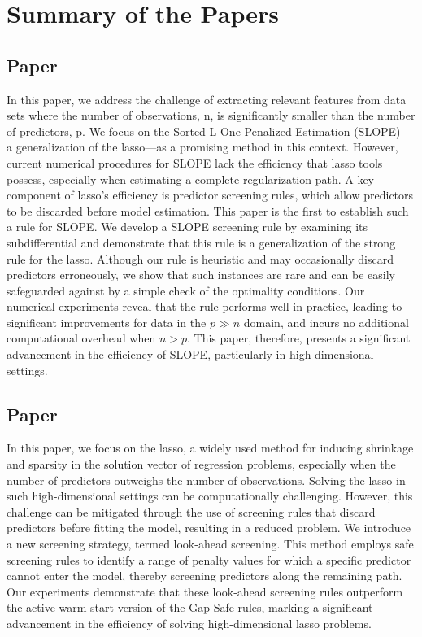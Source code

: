 \section{Summary of the Papers}

\subsection{Paper \I}

In this paper, we address the challenge of extracting relevant features from data sets where the number of observations, n, is significantly smaller than the number of predictors, p. We focus on the Sorted L-One Penalized Estimation (SLOPE)—a generalization of the lasso—as a promising method in this context. However, current numerical procedures for SLOPE lack the efficiency that lasso tools possess, especially when estimating a complete regularization path. A key component of lasso's efficiency is predictor screening rules, which allow predictors to be discarded before model estimation. This paper is the first to establish such a rule for SLOPE. We develop a SLOPE screening rule by examining its subdifferential and demonstrate that this rule is a generalization of the strong rule for the lasso. Although our rule is heuristic and may occasionally discard predictors erroneously, we show that such instances are rare and can be easily safeguarded against by a simple check of the optimality conditions. Our numerical experiments reveal that the rule performs well in practice, leading to significant improvements for data in the \(p \gg n\) domain, and incurs no additional computational overhead when \(n > p\). This paper, therefore, presents a significant advancement in the efficiency of SLOPE, particularly in high-dimensional settings.

\subsection{Paper \II}

In this paper, we focus on the lasso, a widely used method for inducing shrinkage and sparsity in the solution vector of regression problems, especially when the number of predictors outweighs the number of observations. Solving the lasso in such high-dimensional settings can be computationally challenging. However, this challenge can be mitigated through the use of screening rules that discard predictors before fitting the model, resulting in a reduced problem. We introduce a new screening strategy, termed look-ahead screening. This method employs safe screening rules to identify a range of penalty values for which a specific predictor cannot enter the model, thereby screening predictors along the remaining path. Our experiments demonstrate that these look-ahead screening rules outperform the active warm-start version of the Gap Safe rules, marking a significant advancement in the efficiency of solving high-dimensional lasso problems.

